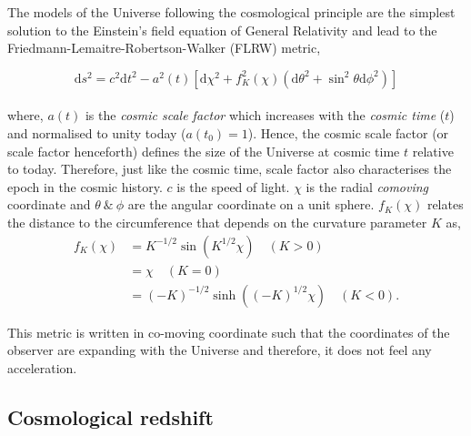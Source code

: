 The models of the Universe following the cosmological principle are the simplest 
solution to the Einstein's field equation of General Relativity and lead to the
Friedmann-Lemaitre-Robertson-Walker (FLRW) metric,

\begin{equation}
	\mathrm{d}s^2 = c^2\mathrm{d}t^2 - a^2(t)\left[ \mathrm{d}\chi^2 + f_K^2(\chi)
					\left( \mathrm{d}\theta^2 + \sin^2\theta \mathrm{d}\phi^2 
					\right)  \right]
	\label{eqn:metric}
\end{equation}
\\
where, $a(t)$ is the {\it cosmic scale factor} which increases with the {\it cosmic time} ($t$)
and normalised to unity today ($a(t_0)=1$). 
Hence, the cosmic scale factor (or scale factor henceforth) defines the
size of the Universe at cosmic time $t$ relative to today. Therefore, just like 
the cosmic time, scale factor also characterises the epoch in the cosmic history.
$c$ is the speed of light. $\chi$ is the
radial {\it comoving} coordinate and $\theta\ \& \ \phi$ are the angular coordinate on a
unit sphere. $f_K(\chi)$ relates the distance to the circumference that depends 
on the curvature parameter $K$ as,
\begin{equation} \label{eq1}
\begin{split}
f_K(\chi) & = K^{-1/2} \sin(K^{1/2}\chi) \quad (K>0) \\
 & = \chi \quad (K=0) \\
 & = (-K)^{-1/2} \sinh((-K)^{1/2}\chi) \quad (K<0).
\end{split}
\end{equation}

This metric is written in co-moving coordinate such that the coordinates of the
observer are expanding with the Universe and therefore, it does not feel any
acceleration.



\subsection{Cosmological redshift}

